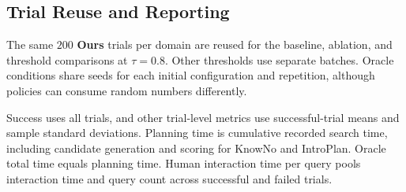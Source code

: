 \subsection{Trial Reuse and Reporting}\label{appx:oracle_reference}\label{appx:randomization}\label{appx:metric_details}
The same $200$ \textbf{Ours} trials per domain are reused for the baseline, ablation, and threshold comparisons at $\tau=0.8$. Other thresholds use separate batches. Oracle conditions share seeds for each initial configuration and repetition, although policies can consume random numbers differently.

Success uses all trials, and other trial-level metrics use successful-trial means and sample standard deviations. Planning time is cumulative recorded search time, including candidate generation and scoring for KnowNo and IntroPlan. Oracle total time equals planning time. Human interaction time per query pools interaction time and query count across successful and failed trials.
